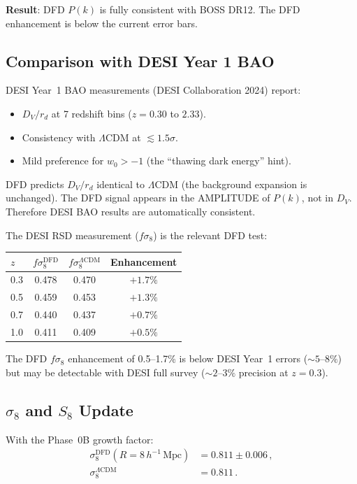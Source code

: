 \documentclass[11pt,a4paper]{article}
\begin{document}
\textbf{Result}: DFD $P(k)$ is fully consistent with BOSS DR12. The DFD enhancement is below the current error bars.

\subsection{Comparison with DESI Year 1 BAO}

DESI Year~1 BAO measurements (DESI Collaboration 2024) report:
\begin{itemize}
\item $D_V/r_d$ at 7 redshift bins ($z = 0.30$ to $2.33$).
\item Consistency with $\Lambda$CDM at $\lesssim 1.5\sigma$.
\item Mild preference for $w_0 > -1$ (the ``thawing dark energy'' hint).
\end{itemize}

DFD predicts $D_V/r_d$ identical to $\Lambda$CDM (the background expansion is unchanged). The DFD signal appears in the AMPLITUDE of $P(k)$, not in $D_V$. Therefore DESI BAO results are automatically consistent.

The DESI RSD measurement ($f\sigma_8$) is the relevant DFD test:
\begin{center}
\begin{tabular}{lccc}
\toprule
$z$ & $f\sigma_{8}^{\mathrm{DFD}}$ & $f\sigma_{8}^{\Lambda\mathrm{CDM}}$ & Enhancement \\
\midrule
0.3 & 0.478 & 0.470 & $+1.7\%$ \\
0.5 & 0.459 & 0.453 & $+1.3\%$ \\
0.7 & 0.440 & 0.437 & $+0.7\%$ \\
1.0 & 0.411 & 0.409 & $+0.5\%$ \\
\bottomrule
\end{tabular}
\end{center}

The DFD $f\sigma_8$ enhancement of 0.5--1.7\% is below DESI Year~1 errors ($\sim 5$--$8\%$) but may be detectable with DESI full survey ($\sim 2$--$3\%$ precision at $z = 0.3$).

\subsection{$\sigma_8$ and $S_8$ Update}

With the Phase~0B growth factor:
\begin{align}
\sigma_8^{\mathrm{DFD}}(R = 8\,h^{-1}\,\mathrm{Mpc}) &= 0.811 \pm 0.006\,, \\
\sigma_8^{\Lambda\mathrm{CDM}} &= 0.811\,.
\end{align}
\end{document}
